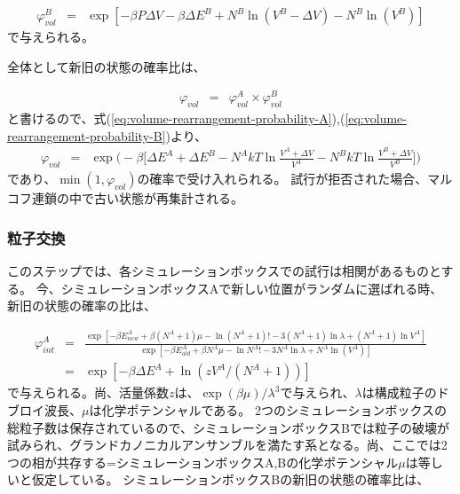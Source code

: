 \documentclass[titlepage]{jsreport}
\begin{document}
\large
\begin{eqnarray}
\varphi_{vol}^B &=& \exp[-{\beta}P{\Delta}V-{\beta}{\Delta}E^B+N^B\ln(V^B-{\Delta}V)-N^B\ln(V^B)]\label{eq:volume-rearrangement-probability-B}
\end{eqnarray}
\normalsize
で与えられる。

全体として新旧の状態の確率比は、

\large
\begin{eqnarray}
\varphi_{vol} &=& \varphi_{vol}^A×\varphi_{vol}^B \nonumber
\end{eqnarray}
\normalsize
と書けるので、式(\ref{eq:volume-rearrangement-probability-A}),(\ref{eq:volume-rearrangement-probability-B})より、
\large
\begin{eqnarray}
\varphi_{vol} &=& \exp\Bigg(-\beta\bigg[{\Delta}E^A+{\Delta}E^B-N^{A}kT\ln{\frac{V^A+\Delta{V}}{V^A}}-N^{B}kT\ln{\frac{V^B+\Delta{V}}{V^B}}\bigg]\Bigg) \label{eq:volume-rearrangement-probability-all}
\end{eqnarray}
であり、$\min(1, \varphi_{vol})$の確率で受け入れられる。
試行が拒否された場合、マルコフ連鎖の中で古い状態が再集計される。

\subsubsection{粒子交換}\label{principle-subsubsec:particle-interchange}
このステップでは、各シミュレーションボックスでの試行は相関があるものとする。
今、シミュレーションボックスAで新しい位置がランダムに選ばれる時、新旧の状態の確率の比は、

\large
\begin{eqnarray}
\varphi_{int}^A &=& \frac{\exp[-{\beta}E^A_{new}+\beta(N^A+1)\mu-\ln(N^A+1)!-3(N^A+1)\ln\lambda+(N^A+1)\ln{V^A}]}{\exp[-{\beta}E^A_{old}+{\beta}N^A{\mu}-\ln{N^A!}-3N^A\ln{\lambda}+N^A\ln(V^A)]}  \nonumber\\
                &=& \exp[-{\beta}{\Delta}E^A+\ln(zV^A/(N^A+1))]\label{eq:particle-interchange-probability-A}
\end{eqnarray}
\normalsize
で与えられる。尚、活量係数$z$は、$\exp(\beta\mu)/\lambda^3$で与えられ、$\lambda$は構成粒子のドブロイ波長、$\mu$は化学ポテンシャルである。
2つのシミュレーションボックスの総粒子数は保存されているので、シミュレーションボックスBでは粒子の破壊が試みられ、グランドカノニカルアンサンブルを満たす系となる。尚、ここでは2つの相が共存する=シミュレーションボックスA,Bの化学ポテンシャル$\mu$は等しいと仮定している。
シミュレーションボックスBの新旧の状態の確率比は、
\end{document}
